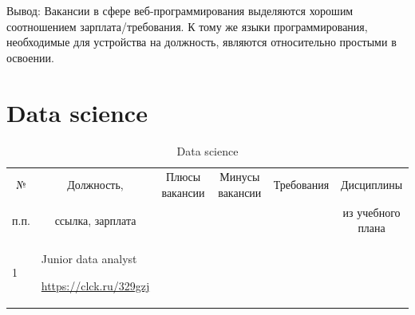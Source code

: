 \documentclass[14pt]{extreport}
\begin{document}
\begin{landscape}
\begin{table}[H]
\begin{center}
\begin{small}
\begin{tabular}{|p{0.1cm}|p{5cm}|p{4.5cm}|p{4.5cm}|p{4cm}|p{3cm}|}
				
				
			\end{tabular}
		\end{small}
	\end{center}
\end{table}
Вывод: Вакансии в сфере веб-программирования выделяются хорошим соотношением зарплата/требования. К тому же языки программирования, необходимые для устройства на должность, являются относительно простыми в освоении.

\begin{table}[H]
	\caption{Data science}\section{Data science}
	\begin{center}
		\begin{small}
		\begin{tabular}{|p{0.1cm}|p{5cm}|p{4.5cm}|p{4.5cm}|p{4cm}|p{3cm}|} \hline
			\multicolumn{1}{|c|}{№}&\multicolumn{1}{c|}{Должность,}&\multicolumn{1}{c|}{Плюсы вакансии}&\multicolumn{1}{c|}{Минусы вакансии}&\multicolumn{1}{c|}{Требования}&\multicolumn{1}{c|}{Дисциплины}\\ 
			\multicolumn{1}{|c|}{п.п.}&\multicolumn{1}{c|}{ссылка, зарплата}&\multicolumn{1}{c|}{}&\multicolumn{1}{c|}{}&\multicolumn{1}{c|}{}&\multicolumn{1}{c|}{из учебного плана}\\ 
			\hline
				1 & Junior data analyst
				
				\url{https://clck.ru/329gzj}
				

\end{tabular}
\end{small}
\end{center}
\end{table}
\end{landscape}
\end{document}
